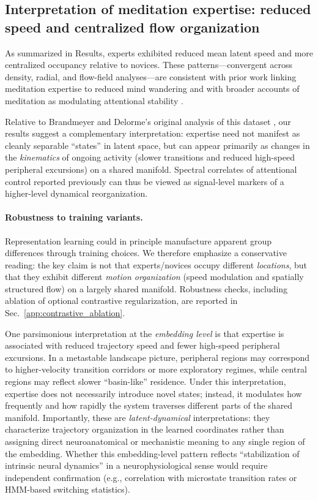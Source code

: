 \documentclass[5p,twocolumn,authoryear]{elsarticle}
\newcommand{\secref}[1]{Sec.~\ref{#1}}
\begin{document}
\subsection{Interpretation of meditation expertise: reduced speed and centralized flow organization}
As summarized in Results, experts exhibited reduced mean latent speed and more centralized occupancy relative to novices. These patterns---convergent across density, radial, and flow-field analyses---are consistent with prior work linking meditation expertise to reduced mind wandering \citep{BrandmeyerDelorme2016} and with broader accounts of meditation as modulating attentional stability \citep{Hasenkamp2012,Christoff2009,SmallwoodSchooler2006}.

Relative to Brandmeyer and Delorme's original analysis of this dataset \citep{BrandmeyerDelorme2016}, our results suggest a complementary interpretation: expertise need not manifest as cleanly separable ``states'' in latent space, but can appear primarily as changes in the \emph{kinematics} of ongoing activity (slower transitions and reduced high-speed peripheral excursions) on a shared manifold. Spectral correlates of attentional control reported previously can thus be viewed as signal-level markers of a higher-level dynamical reorganization.

\paragraph{Robustness to training variants.}
Representation learning could in principle manufacture apparent group differences through training choices. We therefore emphasize a conservative reading: the key claim is not that experts/novices occupy different \emph{locations}, but that they exhibit different \emph{motion organization} (speed modulation and spatially structured flow) on a largely shared manifold. Robustness checks, including ablation of optional contrastive regularization, are reported in \secref{app:contrastive_ablation}.

One parsimonious interpretation at the \emph{embedding level} is that expertise is associated with reduced trajectory speed and fewer high-speed peripheral excursions. In a metastable landscape picture, peripheral regions may correspond to higher-velocity transition corridors or more exploratory regimes, while central regions may reflect slower ``basin-like'' residence. Under this interpretation, expertise does not necessarily introduce novel states; instead, it modulates how frequently and how rapidly the system traverses different parts of the shared manifold. Importantly, these are \emph{latent-dynamical} interpretations: they characterize trajectory organization in the learned coordinates rather than assigning direct neuroanatomical or mechanistic meaning to any single region of the embedding. Whether this embedding-level pattern reflects ``stabilization of intrinsic neural dynamics'' in a neurophysiological sense would require independent confirmation (e.g., correlation with microstate transition rates or HMM-based switching statistics).
\end{document}
